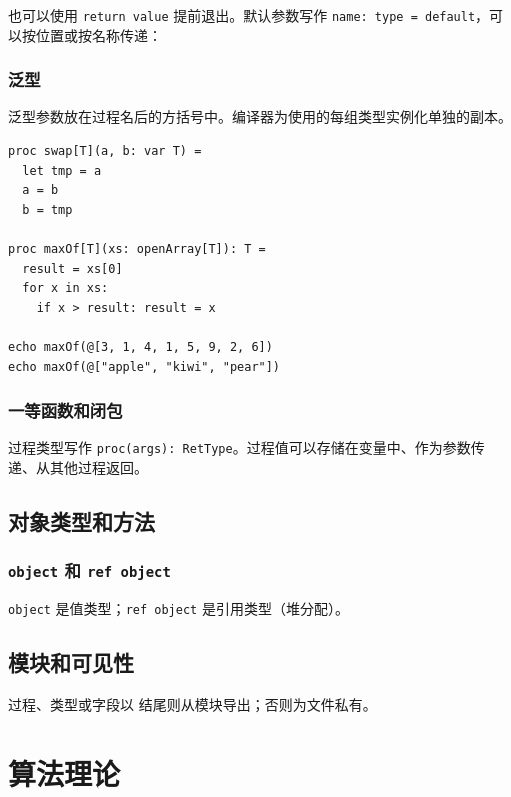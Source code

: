 \documentclass[justified, sixbynine]{tufte-book}
\def\ft{\small\tt}
\theoremstyle{plain}%
\newtheorem * {corollary}{推论}
\theoremstyle{definition}
\theoremstyle{remark}
\newtheorem * {remark}{注记}
\newtheorem * {note}{注释}
\begin{document}
\begin{fullwidth}
也可以使用 {\ft return value} 提前退出。默认参数写作 {\ft name: type = default}，可以按位置或按名称传递：

\goodbreak\subsection{泛型}


泛型参数放在过程名后的方括号中。编译器为使用的每组类型实例化单独的副本。

\begin{lstlisting}
proc swap[T](a, b: var T) =
  let tmp = a
  a = b
  b = tmp

proc maxOf[T](xs: openArray[T]): T =
  result = xs[0]
  for x in xs:
    if x > result: result = x

echo maxOf(@[3, 1, 4, 1, 5, 9, 2, 6])
echo maxOf(@["apple", "kiwi", "pear"])
\end{lstlisting}

\goodbreak\subsection{一等函数和闭包}


过程类型写作 {\ft proc(args): RetType}。过程值可以存储在变量中、作为参数传递、从其他过程返回。

\goodbreak\section{对象类型和方法}

\goodbreak\subsection{{\ft object} 和 {\ft ref object}}

{\ft object} 是值类型；{\ft ref object} 是引用类型（堆分配）。

\goodbreak\section{模块和可见性}

过程、类型或字段以 {\ft *} 结尾则从模块导出；否则为文件私有。

\chapter{算法理论}


\end{fullwidth}
\end{document}
